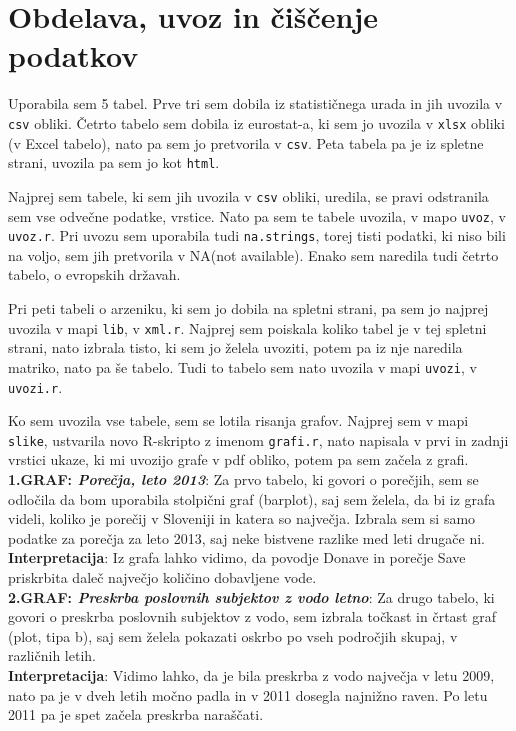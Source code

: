 \documentclass[11pt,a4paper]{article}
\begin{document}
\newpage
\section{Obdelava, uvoz in čiščenje podatkov}

Uporabila sem 5 tabel.
Prve tri sem dobila iz statističnega urada in jih uvozila v \verb|csv| obliki.
Četrto tabelo sem dobila iz eurostat-a, ki sem jo uvozila v \verb|xlsx| obliki (v Excel tabelo), nato pa sem jo pretvorila v \verb|csv|. Peta tabela pa je iz spletne strani, uvozila pa sem jo kot \verb|html|.

Najprej sem tabele, ki sem jih uvozila v \verb|csv| obliki, uredila, se pravi odstranila sem vse odvečne podatke, vrstice. Nato pa sem te tabele uvozila, v mapo \verb|uvoz|, v \verb|uvoz.r|. Pri uvozu sem uporabila tudi \verb|na.strings|, torej tisti podatki, ki niso bili na voljo, sem jih pretvorila v NA(not available). Enako sem naredila tudi četrto tabelo, o evropskih državah.

Pri peti tabeli o arzeniku, ki sem jo dobila na spletni strani, pa sem jo najprej uvozila v mapi \verb|lib|, v \verb|xml.r|. Najprej sem poiskala koliko tabel je v tej spletni strani, nato izbrala tisto, ki sem jo želela uvoziti, potem pa iz nje naredila matriko, nato pa še tabelo. Tudi to tabelo sem nato uvozila v mapi \verb|uvozi|, v \verb|uvozi.r|.

Ko sem uvozila vse tabele, sem se lotila risanja grafov. Najprej sem v mapi \verb|slike|, ustvarila novo R-skripto z imenom \verb|grafi.r|, nato napisala v prvi in zadnji vrstici ukaze, ki mi uvozijo grafe v pdf obliko, potem pa sem začela z grafi.\\


\textbf{1.GRAF: \emph{Porečja, leto 2013}}: Za prvo tabelo, ki govori o porečjih, sem se odločila da bom uporabila stolpični graf (barplot), saj sem želela, da bi iz grafa videli, koliko je porečij v Sloveniji in katera so največja. Izbrala sem si samo podatke za porečja za leto 2013, saj neke bistvene razlike med leti drugače ni.\\
\textbf{Interpretacija}: Iz grafa lahko vidimo, da povodje Donave in porečje Save priskrbita daleč največjo količino dobavljene vode.\\


\textbf{2.GRAF: \emph{Preskrba poslovnih subjektov z vodo letno}}: Za drugo tabelo, ki govori o preskrba poslovnih subjektov z vodo, sem izbrala točkast in črtast graf (plot, tipa b), saj sem želela pokazati oskrbo po vseh področjih skupaj, v različnih letih.\\
\textbf{Interpretacija}: Vidimo lahko, da je bila preskrba z vodo največja v letu 2009, nato pa je v dveh letih močno padla in v 2011 dosegla najnižno raven. Po letu 2011 pa je spet začela preskrba naraščati.\\
\end{document}
